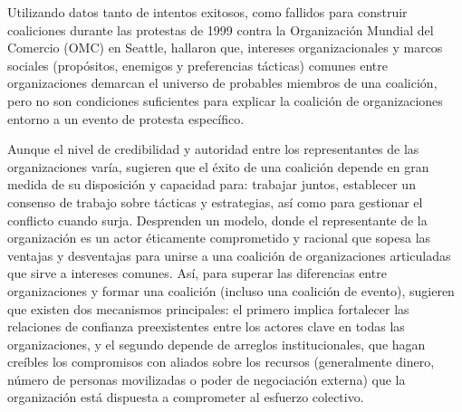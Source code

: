 \documentclass[letterpaper, 11pt]{book}
\theoremstyle{definition}
\theoremstyle{remark}
\begin{document}
Utilizando datos tanto de intentos exitosos, como fallidos para construir coaliciones durante las protestas de 1999 contra la Organización Mundial del Comercio (OMC) en Seattle, \citet{2006_LevyMurphy_coparticipacion} hallaron que, intereses organizacionales y marcos sociales (propósitos, enemigos y preferencias tácticas) comunes entre organizaciones demarcan el universo de probables miembros de una coalición, pero no son condiciones suficientes para explicar la coalición de organizaciones entorno a un evento de protesta específico. 


Aunque el nivel de credibilidad y autoridad entre los representantes de las organizaciones varía, \citet{2006_LevyMurphy_coparticipacion} sugieren que el éxito de una coalición depende en gran medida de su disposición y capacidad para: trabajar juntos, establecer un consenso de trabajo sobre tácticas y estrategias, así como para gestionar el conflicto cuando surja. 
Desprenden un modelo, donde el representante de la organización es un actor éticamente comprometido y racional que sopesa las ventajas y desventajas para unirse a una coalición de organizaciones articuladas que sirve a intereses comunes. 
Así, para superar las diferencias entre organizaciones y formar una coalición (incluso una coalición de evento), sugieren que existen dos mecanismos principales: el primero implica fortalecer las relaciones de confianza preexistentes entre los actores clave en todas las organizaciones, y el segundo depende de arreglos institucionales, que hagan creíbles los compromisos con aliados sobre los recursos (generalmente dinero, número de personas movilizadas o poder de negociación externa) que la organización está dispuesta a comprometer al esfuerzo colectivo.
\end{document}
